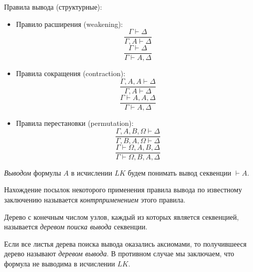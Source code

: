 Правила вывода (структурные):
\begin{itemize}
    \item Правило расширения (weakening):
    \begin{equation*}
        \frac{\Gamma\vdash\Delta}{\Gamma,A\vdash\Delta} \tag{$W_L$}
    \end{equation*}
    \begin{equation*}
        \frac{\Gamma\vdash\Delta}{\Gamma\vdash A,\Delta} \tag{$W_R$}
    \end{equation*}
    \item Правила сокращения (contraction):
    \begin{equation*}
        \frac{\Gamma,A,A\vdash\Delta}{\Gamma,A\vdash\Delta} \tag{$C_L$}
    \end{equation*}
    \begin{equation*}
        \frac{\Gamma\vdash A,A,\Delta}{\Gamma\vdash A,\Delta} \tag{$C_R$}
    \end{equation*}
    \item Правила перестановки (permutation):
    \begin{equation*}
        \frac{\Gamma,A,B,\Omega\vdash\Delta}{\Gamma,B,A,\Omega\vdash\Delta} \tag{$P_L$}
    \end{equation*}
    \begin{equation*}
        \frac{\Gamma\vdash \Omega,A,B,\Delta}{\Gamma\vdash\Omega,B,A,\Delta} \tag{$P_R$}
    \end{equation*}
\end{itemize}

\begin{definition}
    \textit{Выводом} формулы $A$ в исчислении $LK$ будем понимать вывод секвенции $\vdash A$.
\end{definition}

\begin{definition}
    Нахождение посылок некоторого применения правила вывода по известному заключению называется \textit{контрприменением} этого правила.
\end{definition}

\begin{definition}
    Дерево с конечным числом узлов, каждый из которых является секвенцией, называется \textit{деревом поиска вывода} секвенции.
\end{definition}

\begin{definition}
    Если все листья дерева поиска вывода оказались аксиомами, то получившееся дерево называют \textit{деревом вывода}. В противном случае мы заключаем, что формула не выводима в исчислении $LK$.
\end{definition}

